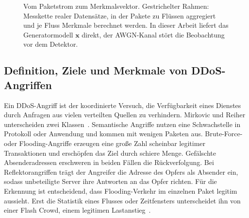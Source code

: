 \begin{figure}[htbp]
	\caption[Vom Paketstrom zum Merkmalsvektor]{Vom Paketstrom zum Merkmalsvektor. Gestrichelter Rahmen: Messkette realer Datensätze, in der Pakete zu Flüssen aggregiert und je Fluss Merkmale berechnet werden. In dieser Arbeit liefert das Generatormodell $\mathbf{x}$ direkt, der AWGN-Kanal stört die Beobachtung vor dem Detektor.}
	\label{fig:paketstrom}
\end{figure}

\subsection{Definition, Ziele und Merkmale von DDoS-Angriffen}
Ein DDoS-Angriff ist der koordinierte Versuch, die Verfügbarkeit eines Dienstes durch Anfragen aus vielen verteilten Quellen zu verhindern. Mirkovic und Reiher unterscheiden zwei Klassen~\autocite{mirkovicTaxonomyDDoSAttack2004}. Semantische Angriffe nutzen eine Schwachstelle in Protokoll oder Anwendung und kommen mit wenigen Paketen aus. Brute-Force- oder Flooding-Angriffe erzeugen eine große Zahl scheinbar legitimer Transaktionen und erschöpfen das Ziel durch schiere Menge. Gefälschte Absenderadressen erschweren in beiden Fällen die Rückverfolgung. Bei Reflektorangriffen trägt der Angreifer die Adresse des Opfers als Absender ein, sodass unbeteiligte Server ihre Antworten an das Opfer richten. Für die Erkennung ist entscheidend, dass Flooding-Verkehr im einzelnen Paket legitim aussieht. Erst die Statistik eines Flusses oder Zeitfensters unterscheidet ihn von einer Flash Crowd, einem legitimen Lastanstieg~\autocite{kumarComprehensiveReviewVulnerabilities2024}.

